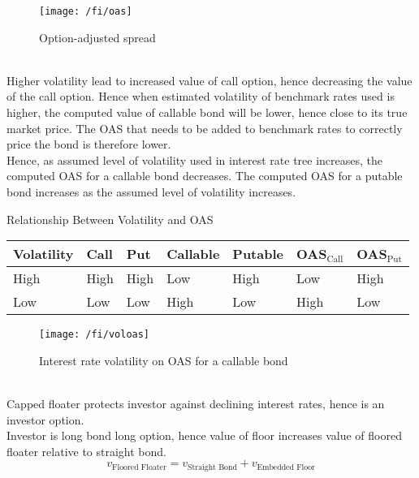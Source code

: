 \begin{figure}[H]
\centering
\texttt{[image: /fi/oas]}
\caption{Option-adjusted spread}
\end{figure}

\begin{remark} \\
Higher volatility lead to increased value of call option, hence decreasing the value of the call option. Hence when estimated volatility of benchmark rates used is higher, the computed value of callable bond will be lower, hence close to its true market price. The OAS that needs to be added to benchmark rates to correctly price the bond is therefore lower.\\
Hence, as assumed level of volatility used in interest rate tree increases, the computed OAS for a callable bond decreases. The computed OAS for a putable bond increases as the assumed level of volatility increases.
\end{remark}

\begin{flushleft}
Relationship Between Volatility and OAS
\begin{tabularx}{\textwidth}{p{5em}|X|X|X|X|X|X}
\hline
\rowcolor{gray!30}
Volatility & Call & Put & Callable & Putable & OAS$_{\text{Call}}$ & OAS$_{\text{Put}}$ \\
\hline
High & High & High & Low & High & Low & High \\
\hline
Low & Low & Low & High & Low & High & Low \\
\hline
\end{tabularx}
\end{flushleft}

\begin{figure}[H]
\centering
\texttt{[image: /fi/voloas]}
\caption{Interest rate volatility on OAS for a callable bond}
\end{figure}

\begin{remark} \\
Capped floater protects investor against declining interest rates, hence is an investor option.\\
Investor is long bond long option, hence value of floor increases value of floored floater relative to straight bond.
\begin{equation}
v_{\text{Floored Floater}} = v_{\text{Straight Bond}} + v_{\text{Embedded Floor}} \nonumber
\end{equation}
\end{remark}

